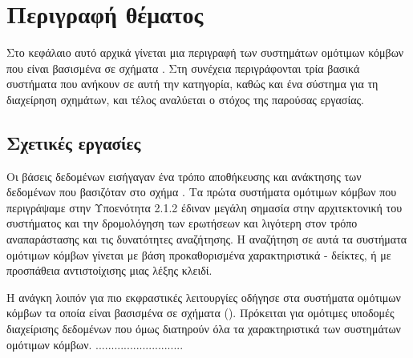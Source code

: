 \chapter{Περιγραφή θέματος}
Στο κεφάλαιο αυτό αρχικά γίνεται μια περιγραφή των συστημάτων
ομότιμων κόμβων που είναι βασισμένα σε σχήματα . Στη συνέχεια περιγράφονται τρία βασικά
συστήματα που ανήκουν σε αυτή την κατηγορία, καθώς και ένα σύστημα
για τη διαχείρηση  σχημάτων, και τέλος αναλύεται ο στόχος
της παρούσας εργασίας.

\section{Σχετικές εργασίες}
Οι βάσεις δεδομένων εισήγαγαν ένα τρόπο αποθήκευσης και ανάκτησης
των δεδομένων που βασιζόταν στο σχήμα . Τα
πρώτα συστήματα ομότιμων κόμβων που περιγράψαμε στην Υποενότητα
2.1.2 έδιναν μεγάλη σημασία στην αρχιτεκτονική του συστήματος και
την δρομολόγηση των ερωτήσεων και λιγότερη στον τρόπο
αναπαράστασης και τις δυνατότητες αναζήτησης. Η αναζήτηση σε αυτά
τα συστήματα ομότιμων κόμβων γίνεται με βάση προκαθορισμένα
χαρακτηριστικά - δείκτες, ή με προσπάθεια αντιστοίχισης μιας λέξης
κλειδί.

Η ανάγκη λοιπόν για πιο εκφραστικές λειτουργίες οδήγησε στα
συστήματα ομότιμων κόμβων τα οποία είναι βασισμένα σε σχήματα
(). Πρόκειται για ομότιμες
υποδομές διαχείρισης δεδομένων που όμως διατηρούν όλα τα
χαρακτηριστικά των συστημάτων ομότιμων κόμβων.
............................